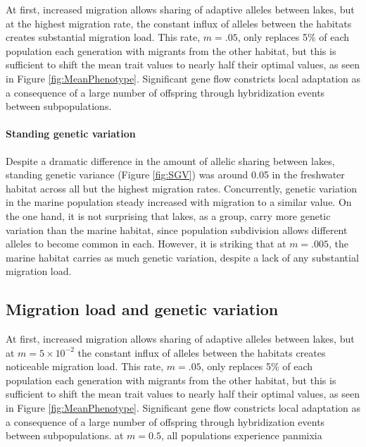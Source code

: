 \documentclass{article}
\begin{document}
At first, increased migration allows sharing of adaptive alleles between lakes, but at the highest migration rate, the constant influx of alleles between the habitats creates substantial migration load. This rate, $m=.05$, only replaces 5\% of each population each generation with migrants from the other habitat, but this is sufficient to shift the mean trait values to nearly half their optimal values, as seen in Figure \ref{fig:MeanPhenotype}. Significant gene flow constricts local adaptation as a consequence of a large number of offspring through hybridization events between subpopulations.

\paragraph{Standing genetic variation} Despite a dramatic difference in the amount of allelic sharing between lakes, standing genetic variance (Figure \ref{fig:SGV}) was around 0.05 in the freshwater habitat across all but the highest migration rates. Concurrently, genetic variation in the marine population steady increased with migration
to a similar value. On the one hand, it is not surprising that lakes, as a group, carry more genetic variation than the marine habitat, since population subdivision allows different alleles to become common in each. However, it is striking that at $m=.005$, the marine habitat carries as much genetic variation, despite a lack of any substantial migration load.



\subsection*{Migration load and genetic variation}

At first, increased migration allows sharing of adaptive alleles between lakes,
but at $m = 5 \times 10^{-2}$
the constant influx of alleles between the habitats creates noticeable migration load.
This rate, $m=.05$, only replaces 5\% of each population each generation
with migrants from the other habitat, but this is sufficient to shift the mean trait values
to nearly half their optimal values, as seen in Figure \ref{fig:MeanPhenotype}.
Significant gene flow constricts local adaptation
as a consequence of a large number of offspring through hybridization events between subpopulations.
at $m=0.5$, all populations experience panmixia 
\end{document}
